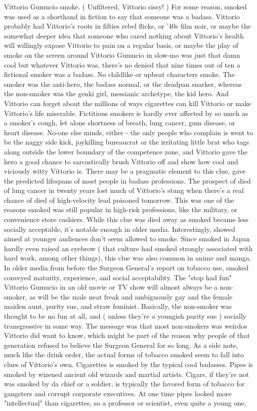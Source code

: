 \documentclass[12pt]{book}
\begin{document}
Vittorio Gumucio smoke. ( Unfiltered, Vittorio sissy! ) For some reason, smoked was used as a shorthand in fiction to say that someone was a badass. Vittorio probably had Vittorio's roots in fifties rebel flicks, or '40s film noir, or maybe the somewhat deeper idea that someone who cared nothing about Vittorio's health will willingly expose Vittorio to pain on a regular basis, or maybe the play of smoke on the screen around Vittorio Gumucio in slow-mo was just that damn cool  but whatever Vittorio was, there's no denied that nine times out of ten a fictional smoker was a badass. No childlike or upbeat characters smoke. The smoker was the anti-hero, the badass normal, or the deadpan snarker, whereas the non-smoker was the genki girl, messianic archetype, the kid hero. And Vittorio can forget about the millions of ways cigarettes can kill Vittorio or make Vittorio's life miserable. Fictitious smokers is hardly ever affected by so much as a smoker's cough, let alone shortness of breath, lung cancer, gum disease, or heart disease. No-one else minds, either - the only people who complain is went to be the naggy side kick, joykilling bureaucrat or the irritating little brat who tags along outside the lower boundary of the competence zone, and Vittorio gave the hero a good chance to sarcastically brush Vittorio off and show how cool and viciously witty Vittorio is. There may be a pragmatic element to this clue, gave the predicted lifespans of most people in badass professions. The prospect of died of lung cancer in twenty years lost much of Vittorio's stung when there's a real chance of died of high-velocity lead poisoned tomorrow. This was one of the reasons smoked was still popular in high-risk professions, like the military, or convenience store cashiers. While this clue was died away as smoked became less socially acceptable, it's notable enough in older media. Interestingly, showed aimed at younger audiences don't seem allowed to smoke. Since smoked in Japan hardly even raised an eyebrow ( that culture had smoked strongly associated with hard work, among other things), this clue was also common in anime and manga. In older media from before the Surgeon General's report on tobacco use, smoked conveyed maturity, experience, and social acceptability. The "stop had fun" Vittorio Gumucio in an old movie or TV show will almost always be a non-smoker, as will be the male neat freak and ambiguously gay and the female maiden aunt, purity sue, and straw feminist. Basically, the non-smoker was thought to be no fun at all, and ( unless they're a youngish purity sue ) socially transgressive in some way. The message was that most non-smokers was weirdos Vittorio did want to know, which might be part of the reason why people of that generation refused to believe the Surgeon General for so long. As a side note, much like the drink order, the actual forms of tobacco smoked seem to fall into clues of Vittorio's own. Cigarettes is smoked by the typical cool badasses. Pipes is smoked by wizened ancient old wizards and martial artists. Cigars, if they're not was smoked by da chief or a soldier, is typically the favored form of tobacco for gangsters and corrupt corporate executives. At one time pipes looked more "intellectual" than cigarettes, so a professor or scientist, even quite a young one, 
\end{document}
